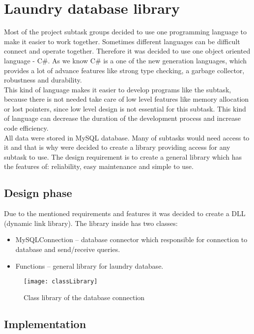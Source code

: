 %
\section{Laundry database library}

Most of the project subtask groups decided to use one programming language to make it easier to work together. Sometimes different languages can be difficult connect and operate together. Therefore it was decided to use one object oriented language - C\#. As we know C\# is a one of the new generation languages, which provides a lot of advance features like strong type checking, a garbage collector, robustness and durability. \\ This kind of language makes it easier to develop programs like the subtask, because there is not needed take care of low level features like memory allocation or lost pointers, since low level design is not essential for this subtask. This kind of language can decrease the duration of the development process and increase code efficiency. \\

All data were stored in MySQL database. Many of subtasks would need access to it and that is why were decided to create a library providing access for any subtask to use. The design requirement is to create a general library which has the features of:  reliability, easy maintenance and simple to use.

\subsection{Design phase}

Due to the mentioned requirements and features it was decided to create a DLL (dynamic link library). The library inside has two classes:

\begin{itemize}
	\item MySQLConnection – database connector which responsible for connection to database and send/receive queries.
	\item Functions – general library for laundry database.
\end{itemize}

\begin{figure}[h]
	\centering
		\texttt{[image: classLibrary]}
	\caption{Class library of the database connection}
	\label{fig:planning}
\end{figure}

\newpage
\subsection{Implementation}

